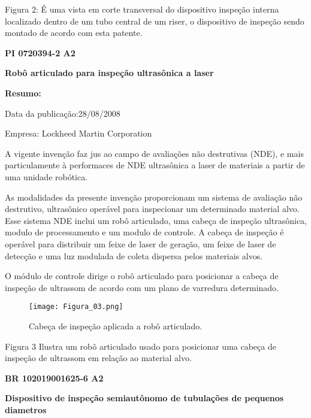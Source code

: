 \documentclass[a4paper,12pt]{article}
\begin{document}
Figura 2: É uma vista em corte transversal do dispositivo inspeção interna
localizado dentro de um tubo central de um riser, o dispositivo de inspeção
sendo montado de acordo com esta patente.

\vspace{1,0cm}
 \begin{center}
  \textbf{PI 0720394-2 A2} 
 
 \textbf{Robô articulado para inspeção ultrasônica a laser}
 \end{center}
 
  \textbf{Resumo:}
 
 Data da publicação:28/08/2008
 
 Empresa: Lockheed Martin Corporation
 
 \vspace{1,0cm}

A vigente invenção faz jus ao campo  de avaliações não destrutivas (NDE), e mais particulamente à performaces de NDE ultrasônica a laser de materiais a partir de uma unidade robótica.

As modalidades da presente invenção proporcionam um sistema de avaliação não destrutivo, ultrasônico operável para inspecionar um determinado material alvo. Esse sistema NDE inclui um robô articulado, uma cabeça de inspeção ultrasônica, modulo de processamento e um modulo de controle. A  cabeça de inspeção é operável para distribuir um feixe de laser de geração, um feixe de laser de detecção e uma luz modulada de coleta dispersa pelos materiais alvos.

O módulo de controle dirige o robô articulado para posicionar a cabeça de inspeção de ultrassom  de acordo com um plano de varredura determinado.

\begin{figure}[!h]
\centering
\texttt{[image: Figura\_03.png]}
\caption{Cabeça de inspeção aplicada a robô articulado.}
\label{fig:CL_logo}\end{figure}

Figura 3 Ilustra um robô articulado usado para posicionar uma cabeça de inspeção de ultrassom em relação ao material alvo.

\vspace{1,0cm}
 \begin{center}
  \textbf{BR 102019001625-6 A2} 
 
 \textbf{Dispositivo de inspeção semiautônomo de tubulações  de pequenos diametros}
 \end{center}
 
\end{document}
